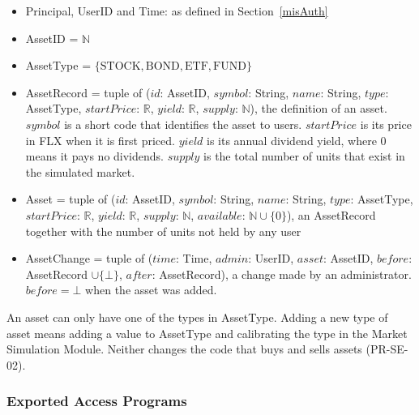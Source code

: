 \documentclass[12pt, titlepage]{article}
\begin{document}
\begin{itemize}
\item Principal, UserID and Time: as defined in Section~\ref{misAuth}
\item AssetID = $\mathbb{N}$
\item AssetType = $\{\mathrm{STOCK}, \mathrm{BOND}, \mathrm{ETF},
  \mathrm{FUND}\}$
\item AssetRecord = tuple of ($\mathit{id}$: AssetID, $\mathit{symbol}$:
  String, $\mathit{name}$: String, $\mathit{type}$: AssetType,
  $\mathit{startPrice}$: $\mathbb{R}$, $\mathit{yield}$: $\mathbb{R}$,
  $\mathit{supply}$: $\mathbb{N}$), the definition of an asset.
  $\mathit{symbol}$ is a short code that identifies the asset to users.
  $\mathit{startPrice}$ is its price in FLX when it is first priced.
  $\mathit{yield}$ is its annual dividend yield, where 0 means it pays no
  dividends. $\mathit{supply}$ is the total number of units that exist in the
  simulated market.
\item Asset = tuple of ($\mathit{id}$: AssetID, $\mathit{symbol}$: String,
  $\mathit{name}$: String, $\mathit{type}$: AssetType, $\mathit{startPrice}$:
  $\mathbb{R}$, $\mathit{yield}$: $\mathbb{R}$, $\mathit{supply}$:
  $\mathbb{N}$, $\mathit{available}$: $\mathbb{N} \cup \{0\}$), an
  AssetRecord together with the number of units not held by any user
\item AssetChange = tuple of ($\mathit{time}$: Time, $\mathit{admin}$:
  UserID, $\mathit{asset}$: AssetID, $\mathit{before}$: AssetRecord $\cup
  \{\bot\}$, $\mathit{after}$: AssetRecord), a change made by an
  administrator. $\mathit{before} = \bot$ when the asset was added.
\end{itemize}

\noindent An asset can only have one of the types in AssetType. Adding a new
type of asset means adding a value to AssetType and calibrating the type in
the Market Simulation Module. Neither changes the code that buys and sells
assets (PR-SE-02).

\subsubsection{Exported Access Programs}
\end{document}
